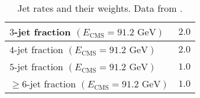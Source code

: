\documentclass[aps,preprint,floatfix,nofootinbib,showpacs]{revtex4-1}
\begin{document}
\begin{table}[tbp]
\begin{center}
\begin{tabular}{l|l}
    $3$-jet fraction $(E_{\text{CMS}}=91.2 \text{ GeV})$               &  \hspace{3cm} $2.0$ \\ \hline
    $4$-jet fraction $(E_{\text{CMS}}=91.2 \text{ GeV})$               &  \hspace{3cm} $2.0$ \\ \hline
    $5$-jet fraction $(E_{\text{CMS}}=91.2 \text{ GeV})$               &  \hspace{3cm} $1.0$ \\ \hline
    $\geq 6$-jet fraction $(E_{\text{CMS}}=91.2 \text{ GeV})$          &  \hspace{3cm} $1.0$ \\ \hline \hline
   \end{tabular}
  \end{center}
  \caption{Jet rates and their weights. Data from \cite{Abreu:1996na, Heister:2003aj}.}
  \label{Tab3}
 \end{table}
 
\end{document}
